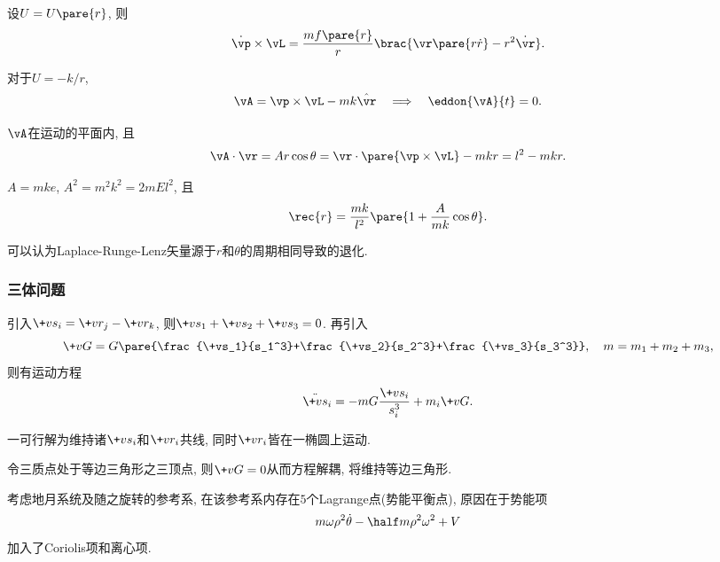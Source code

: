 \documentclass[../TheoreticalMechanics.tex]{subfiles}
\begin{document}
\begin{lemma}[角动量乘速度]\quad
	设$U=U\pare{r}$, 则
	\[ \dot{\vp}\times\vL = \frac{mf\pare{r}}{r}\brac{\vr\pare{r\dot{r}} - r^2\dot{\vr}}. \]
\end{lemma}
\begin{finale}
	\begin{theorem}
		对于$U = -k/r$,
		\[ \vA = \vp\times\vL - mk\hat{\vr}\quad\Longrightarrow\quad \eddon{\vA}{t} = 0. \]
	\end{theorem}
\end{finale}
\begin{lemma}
	$\vA$在运动的平面内, 且
	\[ \vA\cdot\vr = Ar\cos\theta = \vr\cdot\pare{\vp\times\vL} - mkr = l^2 - mkr. \]
\end{lemma}
\begin{corollary}[椭圆轨道]
	$A = mke$, $A^2 = m^2k^2 = 2mEl^2$, 且
	\[ \rec{r} = \frac{mk}{l^2}\pare{1+\frac{A}{mk}\cos\theta}. \]
\end{corollary}
\begin{remark}
	可以认为Laplace-Runge-Lenz矢量源于$r$和$\theta$的周期相同导致的退化.
\end{remark}


\subsubsection{三体问题} %
\label{ssub:三体问题}

\begin{lemma}[相对位矢]
    引入$\+vs_i = \+vr_j - \+vr_k$, 则$\+vs_1 + \+vs_2 + \+vs_3 = 0$. 再引入
    \[ \+vG = G\pare{\frac{\+vs_1}{s_1^3}+\frac{\+vs_2}{s_2^3}+\frac{\+vs_3}{s_3^3}},\quad m = m_1+m_2+m_3, \]
    则有运动方程
    \[ \ddot{\+vs}_i = -mG\frac{\+vs_i}{s_i^3}+m_i\+vG. \]
\end{lemma}
\begin{ex}[三体问题的Euler解]
    一可行解为维持诸$\+vs_i$和$\+vr_i$共线, 同时$\+vr_i$皆在一椭圆上运动.
\end{ex}
\begin{ex}[三体问题的Lagrange解]
    令三质点处于等边三角形之三顶点, 则$\+vG = 0$从而方程解耦, 将维持等边三角形.
\end{ex}
\begin{ex}[三体问题的微扰解]
    考虑地月系统及随之旋转的参考系, 在该参考系内存在$5$个Lagrange点(势能平衡点), 原因在于势能项
    \[ m\omega \rho^2 \dot{\theta} - \half m\rho^2\omega^2 + V \]
    加入了Coriolis项和离心项.
\end{ex}
\end{document}
